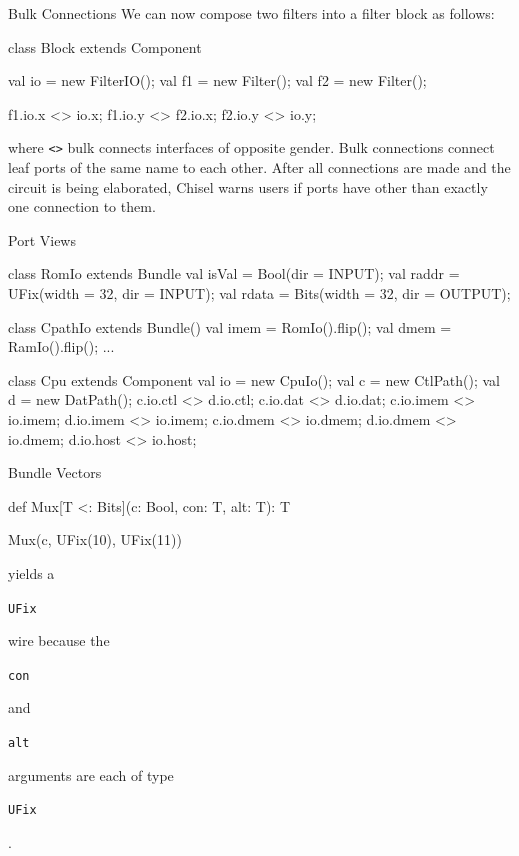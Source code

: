 \documentclass[xcolor=pdflatex,dvipsnames,table]{beamer}
\newcommand{\kode}[1]{\begin{footnotesize}{\tt #1}\end{footnotesize}}
\begin{document}
\begin{frame}[fragile]{Bulk Connections}
We can now compose two filters into a filter block as follows:

\begin{scala}
class Block extends Component { 
  val io = new FilterIO();
  val f1 = new Filter();
  val f2 = new Filter();

  f1.io.x <> io.x;
  f1.io.y <> f2.io.x;
  f2.io.y <> io.y;
}
\end{scala}

\noindent
where \verb+<>+ bulk connects interfaces of opposite gender.
Bulk connections connect leaf ports of the same name to each other.
After all connections are made and the circuit is being elaborated,
Chisel warns users if ports have other than exactly one connection to them.

\end{frame}


\begin{frame}[fragile]{Port Views}
\begin{tiny}
\begin{scala}
class RomIo extends Bundle {
  val isVal = Bool(dir = INPUT);
  val raddr = UFix(width = 32, dir = INPUT);
  val rdata = Bits(width = 32, dir = OUTPUT);
}

class CpathIo extends Bundle() {
  val imem = RomIo().flip();
  val dmem = RamIo().flip();
  ...
}

class Cpu extends Component {
  val io = new CpuIo();
  val c  = new CtlPath();
  val d  = new DatPath();
  c.io.ctl  <> d.io.ctl;
  c.io.dat  <> d.io.dat;
  c.io.imem <> io.imem;
  d.io.imem <> io.imem;
  c.io.dmem <> io.dmem;
  d.io.dmem <> io.dmem;
  d.io.host <> io.host;
}
\end{scala}
\end{tiny}
\end{frame}


\begin{frame}[fragile]{Bundle Vectors}
\begin{scala}
def Mux[T <: Bits](c: Bool, con: T, alt: T): T

Mux(c, UFix(10), UFix(11))
\end{scala}

\noindent
yields a \kode{UFix} wire because the \kode{con} and \kode{alt} arguments are each of type \kode{UFix}.
\end{frame}
\end{document}
